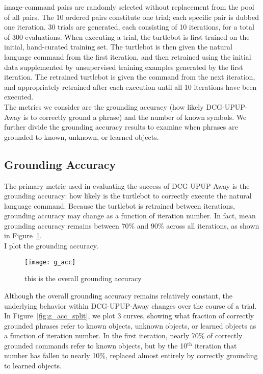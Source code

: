  image-command pairs are randomly selected without replacement from the pool of all pairs.
The 10 ordered pairs constitute one trial; each specific pair is dubbed one iteration.
30 trials are generated, each consisting of 10 iterations, for a total of 300 evaluations.
When executing a trial, the turtlebot is first trained on the initial, hand-curated training set.
The turtlebot is then given the natural language command from the first iteration, and then retrained using the initial data supplemented by unsupervised training examples generated by the first iteration.
The retrained turtlebot is given the command from the next iteration, and appropriately retrained after each execution until all 10 iterations have been executed.\\
\indent The metrics we consider are the grounding accuracy (how likely DCG-UPUP-Away is to correctly ground a phrase) and the number of known symbols.
We further divide the grounding accuracy results to examine when phrases are grounded to known, unknown, or learned objects.
\subsection{Grounding Accuracy}
The primary metric used in evaluating the success of DCG-UPUP-Away is the grounding accuracy: how likely is the turtlebot to correctly execute the natural language command.
Because the turtlebot is retrained between iterations, grounding accuracy may change as a function of iteration number.
In fact, mean grounding accuracy remains between 70\% and 90\% across all iterations, as shown in Figure~\ref{fig:g_acc}.\\
I plot the grounding accuracy.
\begin{figure}[h]
\centering
\texttt{[image: g\_acc]}
\caption{this is the overall grounding accuracy}
\label{fig:g_acc}
\end{figure}

\indent Although the overall grounding accuracy remains relatively constant, the underlying behavior within DCG-UPUP-Away changes over the course of a trial.
In Figure~\ref{fig:g_acc_split}, we plot 3 curves, showing what fraction of correctly grounded phrases refer to known objects, unknown objects, or learned objects as a function of iteration number.
In the first iteration, nearly 70\% of correctly grounded commands refer to known objects, but by the 10$^\text{th}$ iteration that number has fallen to nearly 10\%, replaced almost entirely by correctly grounding to learned objects.

